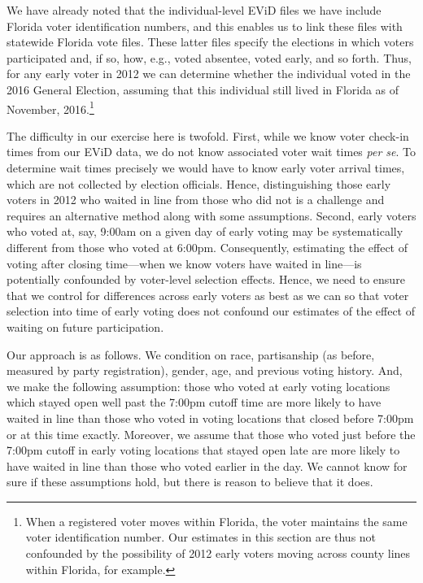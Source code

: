 \documentclass[12pt,titlepage]{article}
\begin{document}
We have already noted that the individual-level EViD files we have
include Florida voter identification numbers, and this enables us to
link these files with statewide Florida vote files.  These latter
files specify the elections in which voters participated and, if so,
how, e.g., voted absentee, voted early, and so forth.  Thus, for any
early voter in 2012 we can determine whether the individual voted in
the 2016 General Election, assuming that this individual still lived
in Florida as of November, 2016.\footnote{When a registered voter
  moves within Florida, the voter maintains the same voter
  identification number.  Our estimates in this section are thus not
  confounded by the possibility of 2012 early voters moving across
  county lines within Florida, for example.}  

The difficulty in our exercise here is twofold.  First, while we know
voter check-in times from our EViD data, we do not know associated
voter wait times \emph{per se}.  To determine wait times precisely we
would have to know early voter arrival times, which are not collected
by election officials.  Hence, distinguishing those early voters in
2012 who waited in line from those who did not is a challenge and
requires an alternative method along with some assumptions.  Second,
early voters who voted at, say, 9:00am on a given day of early voting
may be systematically different from those who voted at
6:00pm. Consequently, estimating the effect of voting after closing
time---when we know voters have waited in line---is potentially
confounded by voter-level selection effects.  Hence, we need to ensure
that we control for differences across early voters as best as we can
so that voter selection into time of early voting does not confound
our estimates of the effect of waiting on future participation.

Our approach is as follows.  We condition on race, partisanship (as
before, measured by party registration), gender, age, and previous
voting history.  And, we make the following assumption: those who
voted at early voting locations which stayed open well past the 7:00pm
cutoff time are more likely to have waited in line than those who
voted in voting locations that closed before 7:00pm or at this time
exactly.  Moreover, we assume that those who voted just before the
7:00pm cutoff in early voting locations that stayed open late are more
likely to have waited in line than those who voted earlier in the day.
We cannot know for sure if these assumptions hold, but there is reason
to believe that it does.
\end{document}
